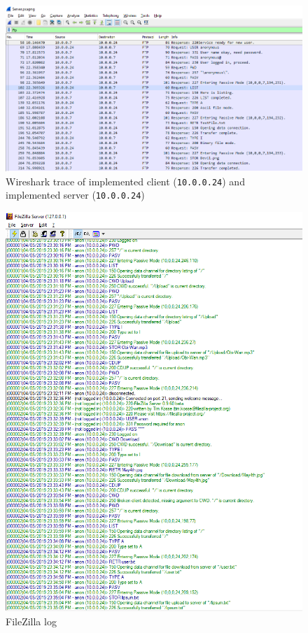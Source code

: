 \documentclass[10pt,twocolumn]{witseiepaper}
\def\code#1{\texttt{#1}}
\begin{document}
\begin{appendices}
\begin{figure}[h!]
\renewcommand{\thefigure}{\arabic{figure}}
\centering
\includegraphics[scale=0.6]{ServerWireshark.png}
\caption{Wireshark trace of implemented client (\code{10.0.0.24}) and implemented server (\code{10.0.0.24})}
\label{fig: Server Wireshark}
\end{figure}

\begin{figure}[h!]
\renewcommand{\thefigure}{\arabic{figure}}
\centering
\includegraphics[scale=0.9]{FileZilla.png}
\caption{FileZilla log}
\label{fig: FileZilla log}
\end{figure}


\end{appendices}
\end{document}
